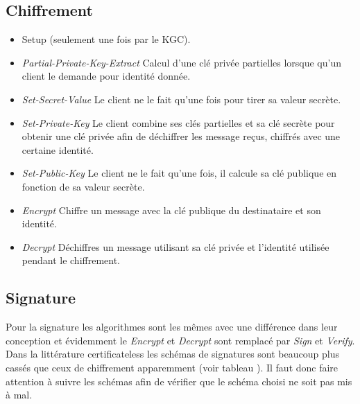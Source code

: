 \subsection{Chiffrement}
\begin{itemize}
	\item Setup (seulement une fois par le KGC).
	\item \textit{Partial-Private-Key-Extract} Calcul d'une clé privée partielles lorsque qu'un client le demande pour identité donnée.
	\item \textit{Set-Secret-Value} Le client ne le fait qu'une fois pour tirer sa valeur secrète.
	\item \textit{Set-Private-Key} Le client combine ses clés partielles et sa clé secrète pour obtenir une clé privée afin de déchiffrer les message reçus, chiffrés avec une certaine identité.
	\item \textit{Set-Public-Key} Le client ne le fait qu'une fois, il calcule sa clé publique en fonction de sa valeur secrète.
	\item \textit{Encrypt} Chiffre un message avec la clé publique du destinataire et son identité.
	\item \textit{Decrypt} Déchiffres un message utilisant sa clé privée et l'identité utilisée pendant le chiffrement.
\end{itemize}
\subsection{Signature}
Pour la signature les algorithmes sont les mêmes avec une différence dans leur conception et évidemment le \textit{Encrypt} et \textit{Decrypt} sont remplacé par \textit{Sign} et \textit{Verify}.
Dans la littérature certificateless les schémas de signatures sont beaucoup plus cassés que ceux de chiffrement apparemment (voir tableau ). Il faut donc faire attention à suivre les schémas afin de vérifier que le schéma choisi ne soit pas mis à mal.
